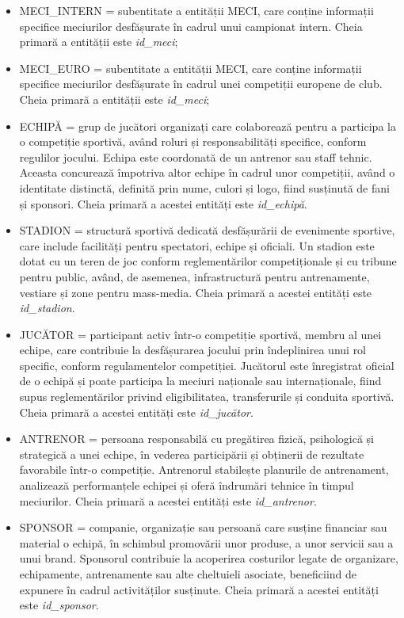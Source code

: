 \documentclass{article}
\begin{document}
\begin{itemize}
	\item MECI\_INTERN = subentitate a entității MECI, care conține informații specifice meciurilor desfășurate în cadrul unui campionat intern. Cheia primară a entității este \textit{id\_meci};
	
	\item MECI\_EURO = subentitate a entității MECI, care conține informații specifice meciurilor desfășurate în cadrul unei competiții europene de club. Cheia primară a entității este \textit{id\_meci}; 
	
	\item ECHIPĂ = grup de jucători organizați care colaborează pentru a participa la o competiție sportivă, având roluri și responsabilități specifice, conform regulilor jocului. Echipa este coordonată de un antrenor sau staff tehnic. Aceasta concurează împotriva altor echipe în cadrul unor competiții, având o identitate distinctă, definită prin nume, culori și logo, fiind susținută de fani și sponsori. Cheia primară a acestei entități este \textit{id\_echipă}.
	
	\item STADION = structură sportivă dedicată desfășurării de evenimente sportive, care include facilități pentru spectatori, echipe și oficiali. Un stadion este dotat cu un teren de joc conform reglementărilor competiționale și cu tribune pentru public, având, de asemenea, infrastructură pentru antrenamente, vestiare și zone pentru mass-media. Cheia primară a acestei entități este \textit{id\_stadion}.
	
	\item JUCĂTOR = participant activ într-o competiție sportivă, membru al unei echipe, care contribuie la desfășurarea jocului prin îndeplinirea unui rol specific, conform regulamentelor competiției. Jucătorul este înregistrat oficial de o echipă și poate participa la meciuri naționale sau internaționale, fiind supus reglementărilor privind eligibilitatea, transferurile și conduita sportivă. Cheia primară a acestei entități este \textit{id\_jucător}.
	
	\item ANTRENOR = persoana responsabilă cu pregătirea fizică, psihologică și strategică a unei echipe, în vederea participării și obținerii de rezultate favorabile într-o competiție. Antrenorul stabilește planurile de antrenament, analizează performanțele echipei și oferă îndrumări tehnice în timpul meciurilor. Cheia primară a acestei entități este \textit{id\_antrenor}.
	
	\item SPONSOR = companie, organizație sau persoană care susține financiar sau material o echipă, în schimbul promovării unor produse, a unor servicii sau a unui brand. Sponsorul contribuie la acoperirea costurilor legate de organizare, echipamente, antrenamente sau alte cheltuieli asociate, beneficiind de expunere în cadrul activităților susținute. Cheia primară a acestei entități este \textit{id\_sponsor}.
	
	\end{itemize}	
	
\end{document}
